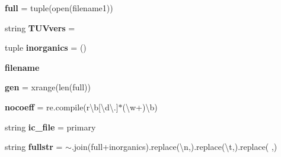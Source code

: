 \begin{DoxyCompactItemize}
\item 
\mbox{\label{namespaceMCM__subset__new_af9f398cf9f2304f5c784ba64fe0a956a}} 
{\bfseries full} = tuple(open(filename1))
\item 
\mbox{\label{namespaceMCM__subset__new_afdce12b664a5a3dc4e223a7bc5438e28}} 
string {\bfseries T\+U\+Vvers} = \textquotesingle{}\textquotesingle{}
\item 
\mbox{\label{namespaceMCM__subset__new_abdfe950aefd819de443d25f796f2e3da}} 
tuple {\bfseries inorganics} = ()
\item 
\mbox{\label{namespaceMCM__subset__new_a9b361740470d122eff875f248bb90eee}} 
{\bfseries filename}
\item 
\mbox{\label{namespaceMCM__subset__new_ac1a9f1e54f0bdaba3cc4790f1321ad5f}} 
{\bfseries gen} = xrange(len(full))
\item 
\mbox{\label{namespaceMCM__subset__new_a53cf11d98aff25ae3fbf7ec8f9e5e4d9}} 
{\bfseries nocoeff} = re.\+compile(r\textquotesingle{}\textbackslash{}b\mbox{[}\textbackslash{}d\textbackslash{}.\mbox{]}$\ast$(\textbackslash{}w+)\textbackslash{}b\textquotesingle{})
\item 
\mbox{\label{namespaceMCM__subset__new_a3e10499ed29d59395e7cc7f8e5c56f3e}} 
string {\bfseries ic\+\_\+file} = \textquotesingle{}primary\textquotesingle{}
\item 
\mbox{\label{namespaceMCM__subset__new_ad45f2c81efd10535928384b6c960b836}} 
string {\bfseries fullstr} = \textquotesingle{}$\sim$\textquotesingle{}.join(full+inorganics).replace(\textquotesingle{}\textbackslash{}n\textquotesingle{},\textquotesingle{}\textquotesingle{}).replace(\textquotesingle{}\textbackslash{}t\textquotesingle{},\textquotesingle{}\textquotesingle{}).replace(\textquotesingle{} \textquotesingle{},\textquotesingle{}\textquotesingle{})
\item 
\mbox{\label{namespaceMCM__subset__new_a076829d8a1ef1735ed0710b502d68781}} 

\end{DoxyCompactItemize}
